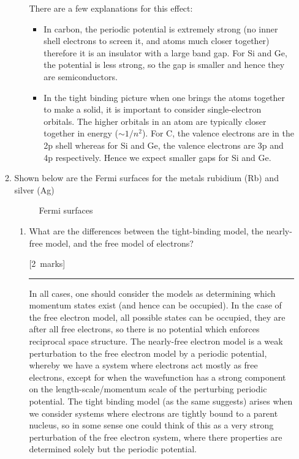 \documentclass[12pt,a4paper]{article}
\newcommand{\sepline}[0]{\par \hfil\rule{10cm}{0.4pt} \vspace*{\parskip}\hfil}
\begin{document}
\begin{enumerate}
\begin{enumerate}
\begin{enumerate}
\begin{answer}
							There are a few explanations for this effect:
							\begin{itemize}
							 	\item In carbon, the periodic potential is extremely strong (no inner shell	electrons to screen it, and atoms much closer together) therefore it is	an insulator with a large band gap. For Si and Ge, the potential is less strong, so the gap is smaller and hence they are semiconductors.

								\item In the tight binding picture when one brings the atoms together to make a solid, it is important to consider single-electron orbitals. The higher orbitals in an atom are typically closer together in energy ($\sim 1/n^2$). For C, the valence electrons are in the 2p shell whereas for Si and Ge, the valence electrons are 3p and 4p respectively. Hence we expect smaller gaps for Si and Ge.
							\end{itemize}

						\end{answer}

					\end{enumerate}

					\item	Shown below are the Fermi surfaces for the metals rubidium (Rb) and silver (Ag)

					\begin{figure}[h]
						\centering
				    \qquad
				    \caption{Fermi surfaces}%
					\end{figure}

					\begin{enumerate}
						\item What are the differences between the tight-binding model, the nearly-free model, and the free model of electrons?

						\hfill{[2~marks]}

						\begin{answer}

							\sepline

							In all cases, one should consider the models as determining which momentum states exist (and hence can be occupied). In the case of the free electron model, all possible states can be occupied, they are after all free electrons, so there is no potential which enforces reciprocal space structure. The nearly-free electron model is a weak perturbation to the free electron model by a periodic potential, whereby we have a system where electrons act mostly as free electrons, except for when the wavefunction has a strong component on the length-scale/momentum scale of the perturbing periodic potential. The tight binding model (as the same suggests) arises when we consider systems where electrons are tightly bound to a parent nucleus, so in some sense one could think of this as a very strong perturbation of the free electron system, where there properties are determined solely but the periodic potential.


\end{answer}
\end{enumerate}
\end{enumerate}
\end{enumerate}
\end{document}
